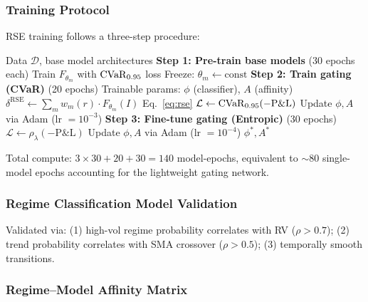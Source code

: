 \subsubsection{Training Protocol}

RSE training follows a three-step procedure:

\begin{algorithm}[t]
\caption{RSE Training Protocol}
\label{alg:rse}
\begin{algorithmic}[1]
\REQUIRE Data $\mathcal{D}$, base model architectures
\STATE \textbf{Step 1: Pre-train base models} (30 epochs each)
    \STATE Train $F_{\theta_m}$ with $\mathrm{CVaR}_{0.95}$ loss
    \STATE Freeze: $\theta_m \gets \text{const}$
\ENDFOR
\STATE
\STATE \textbf{Step 2: Train gating (CVaR)} (20 epochs)
\STATE Trainable params: $\phi$ (classifier), $A$ (affinity)
        \STATE $\delta^{\mathrm{RSE}} \gets \sum_m w_m(r) \cdot F_{\theta_m}(I)$ \hfill Eq.~\eqref{eq:rse}
        \STATE $\mathcal{L} \gets \mathrm{CVaR}_{0.95}(-\mathrm{P\&L})$
        \STATE Update $\phi, A$ via Adam (lr $= 10^{-3}$)
    \ENDFOR
\ENDFOR
\STATE
\STATE \textbf{Step 3: Fine-tune gating (Entropic)} (30 epochs)
        \STATE $\mathcal{L} \gets \rho_\lambda(-\mathrm{P\&L})$
        \STATE Update $\phi, A$ via Adam (lr $= 10^{-4}$)
    \ENDFOR
\ENDFOR
\RETURN $\phi^*, A^*$
\end{algorithmic}
\end{algorithm}

Total compute: $3 \times 30 + 20 + 30 = 140$ model-epochs, equivalent to $\sim$80 single-model epochs accounting for the lightweight gating network.

\subsubsection{Regime Classification Model Validation}

Validated via: (1) high-vol regime probability correlates with RV ($\rho > 0.7$); (2) trend probability correlates with SMA crossover ($\rho > 0.5$); (3) temporally smooth transitions.

\subsubsection{Regime--Model Affinity Matrix}

